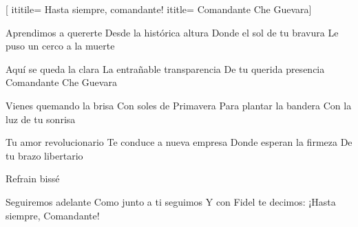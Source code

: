 [
ititile= {Hasta siempre, comandante!}
ititle= {Comandante Che Guevara}]


\beginverse
Aprendimos a quererte
Desde la histórica altura
Donde el sol de tu bravura
Le puso un cerco a la muerte
\endverse

\beginchorus
Aquí se queda la clara
La entrañable transparencia
De tu querida presencia
Comandante Che Guevara
\endchorus

\beginverse
Vienes quemando la brisa
Con soles de Primavera
Para plantar la bandera
Con la luz de tu sonrisa
\endverse

\beginverse
Tu amor revolucionario
Te conduce a nueva empresa
Donde esperan la firmeza
De tu brazo libertario
\endverse

\beginchorus
Refrain bissé
\endchorus

\beginverse
Seguiremos adelante
Como junto a ti seguimos
Y con Fidel te decimos:
¡Hasta siempre, Comandante!
\endverse

\endsong